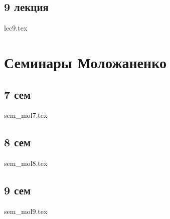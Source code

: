 \chapter{9 лекция}
{lec9.tex}
\part{Семинары Моложаненко}
\chapter{7 сем}
{sem_mol7.tex}
\chapter{8 сем}
{sem_mol8.tex}
\chapter{9 сем}
{sem_mol9.tex}



